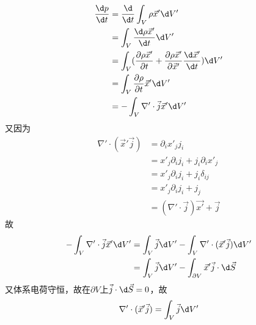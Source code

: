 \documentclass{phyasgn}
\begin{document}
\begin{sol}[1]
  \begin{align*}
    \frac{\d p}{\d t}&=\frac{\d }{\d t}\int_V\rho \vec{x}'\d V'\\
    &=\int_V\frac{\d \rho \vec{x}'}{\d t}\d V'\\
    &=\int_V(\frac{\partial \rho \vec{x}'}{\partial t}+\frac{\partial \rho \vec{x}'}{\partial \vec{x}'}\frac{\d \vec{x}'}{\d t})\d V'\\
    &=\int_V\frac{\partial \rho}{\partial t}\vec{x}'\d V'\\
    &=-\int_V\nabla'\cdot\vec{j}\vec{x}'\d V'
  \end{align*}  
  又因为
  \begin{align*}
    \nabla'\cdot (\vec{x}'\vec{j})&=\partial_ix'_jj_i\\
    &=x'_j\partial_ij_i+j_i\partial_ix'_j\\
    &=x'_j\partial_ij_i+j_i\delta_{ij}\\
    &=x'_j\partial_ij_i+j_j\\
    &=(\nabla'\cdot \vec{j})\vec{x'}+\vec{j}
  \end{align*}
  故\begin{align*}
    -\int_V\nabla'\cdot\vec{j}\vec{x}'\d V'&=\int_V\vec{j}\d V'-\int_V \nabla'\cdot (\vec{x}'\vec{j})\d V'\\
    &=\int_V\vec{j}\d V'-\int_{\partial V} \vec{x}'\vec{j}\cdot\d \vec{S}
  \end{align*}
  又体系电荷守恒，故在$\partial V$上$\vec{j}\cdot\d \vec{S}=0$，故
  \begin{align*}
    \nabla'\cdot (\vec{x}'\vec{j})=\int_V\vec{j}\d V'
  \end{align*}
\end{sol}\par
\end{document}
